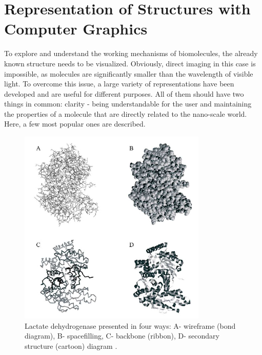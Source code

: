 \section{Representation of Structures with Computer Graphics}   %
To explore and understand the working mechanisms of biomolecules, the already known structure needs to be visualized. Obviously, direct imaging in this case is impossible, as molecules are significantly smaller than the wavelength of visible light. To overcome this issue, a large variety of representations have been developed and are useful for different purposes. All of them should have two things in common: clarity - being understandable for the user and maintaining the properties of a molecule that are directly related to the nano-scale world. Here, a few most popular ones are described.

\begin{figure}[h] 
\centering    
\includegraphics[width=0.8\textwidth]{Figs/visualization.jpg}
\caption{Lactate dehydrogenase presented in four ways: A- wireframe (bond diagram), B- spacefilling, C- backbone (ribbon), D- secondary structure (cartoon) diagram \cite{Gruca10}.}
\label{fig:visualization}
\end{figure}

